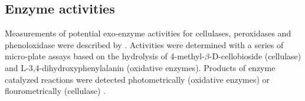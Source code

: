 \documentclass[authoryear,preprint,review,12pt]{elsarticle}
\begin{document}
                                                                                                                                                                                                                                                                                                                                                                                                                                                                                                                                                                                                                                                                                                                                                                                                                                                                                                                                                                                                                                                                                                                              \subsection{Enzyme activities}

                                                                                                                                                                                                                                                                                                                                                                                                                                                                                                                                                                                                                                                                                                                                                                                                                                                                                                                                                                                                                                                                                                                              Measurements of potential exo-enzyme activities for cellulases, peroxidases and phenoloxidase were described by \cite{Leitner2011}. Activities were determined with a series of micro-plate assays based on the hydrolysis of 4-methyl-$\beta$-D-cellobioside (cellulase) and L-3,4-di\-hydroxy\-phenyl\-alanin (oxidative enzymes). Products of enzyme catalyzed reactions were detected photometrically (oxidative enzymes) or flourometrically (cellulase) \citep{Marx2001, Sinsabaugh1999, Kaiser2010b}.
\end{document}
